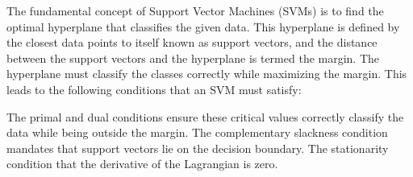 The fundamental concept of Support Vector Machines (SVMs) is to find the optimal hyperplane that classifies the given data. This hyperplane is defined by the closest data points to itself known as support vectors, and the distance between the support vectors and the hyperplane is termed the margin. The hyperplane must classify the classes correctly while maximizing the margin. This leads to the following  conditions that an SVM  must satisfy: 
%
%

The primal and dual conditions ensure these critical values correctly classify the data while being outside the margin. The complementary slackness condition mandates that support vectors lie on the decision boundary. 
The stationarity condition  that the derivative of the Lagrangian is zero. %


